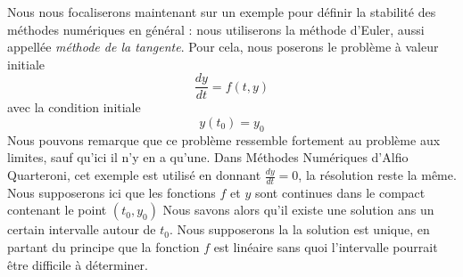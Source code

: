 \documentclass[12pt]{article}
\begin{document}
\quad Nous nous focaliserons maintenant sur un exemple pour définir la stabilité des méthodes numériques en général : nous utiliserons la méthode d'Euler, aussi appellée \emph{méthode de la tangente}.  Pour cela, nous poserons le problème à valeur initiale
\begin{equation} \label{problemevaleurinitiale}
\frac{dy}{dt} = f(t,y)
\end{equation}
avec la condition initiale
\begin{equation} \label{condInitPVI}
y(t_0) = y_0
\end{equation}
Nous pouvons remarque que ce problème ressemble fortement au problème aux limites, sauf qu'ici il n'y en a qu'une. Dans Méthodes Numériques d'Alfio Quarteroni, cet exemple est utilisé en donnant $\frac{dy}{dt} = 0$, la résolution reste la même.
\quad Nous supposerons ici que les fonctions $f$ et $y$ sont continues dans le compact contenant le point $(t_0, y_0)$ Nous savons alors qu'il existe une solution ans un certain intervalle autour de $t_0$.  Nous supposerons la la solution est unique, en partant du principe que la fonction $f$ est linéaire sans quoi l'intervalle pourrait être difficile à déterminer. 
\end{document}
